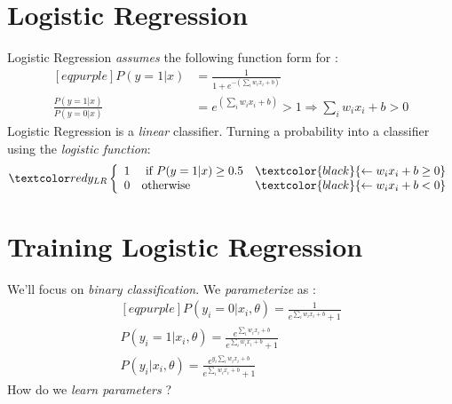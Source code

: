 \documentclass[
	exam={Midterm}
]{cs584exam}
\begin{document}
\section{Logistic Regression}\label{sec:logistic-regression}
Logistic Regression \emph{assumes} the following function form for :
\begin{equation*}
	\begin{aligned}[eqpurple]
		P(y=1|x) &= \frac{1}{1+e^{-\left( \sum_{i}w_{i}x_{i} + b \right)}}\\
		\frac{P(y=1|x)}{P(y=0|x)} &= e^{\left( \sum_{i}w_{i}x_{i} + b \right)} > 1 \Rightarrow \sum_{i} w_{i}x_{i} + b > 0
	\end{aligned}
\end{equation*}
Logistic Regression is a \emph{linear} classifier.
Turning a probability into a classifier using the \emph{logistic function}:
\[ \data{ y_{LR}\left\{ \begin{array}{clr}
							1 & \mbox{ if } P(y=1|x) \geq 0.5 & \textcolor{black}{\leftarrow w_{i}x_{i} + b \geq 0}\\
							0 & \mbox{otherwise} & \textcolor{black}{\leftarrow w_{i}x_{i} + b < 0}
\end{array} \right. } \]

\section{Training Logistic Regression}\label{sec:training-logistic-regression}
We'll focus on \emph{binary classification}.
We \emph{parameterize}  as \data{$\theta$}:
\begin{equation*}
	\begin{aligned}[eqpurple]
		P(y_{i} = 0|x_{i},\theta) = \frac{1}{e^{\sum_{i} w_{i}x_{i} + b}+1}\\
		P(y_{i} = 1|x_{i},\theta) = \frac{e^{\sum_{i} w_{i}x_{i} + b}}{e^{\sum_{i} w_{i}x_{i} + b}+1}\\
		P(y_{i}|x_{i},\theta) = \frac{e^{y_{i}\sum_{i} w_{i}x_{i} + b}}{e^{\sum_{i} w_{i}x_{i} + b}+1}
	\end{aligned}
\end{equation*}
How do we \emph{learn parameters} \data{$\theta$}?
\end{document}
